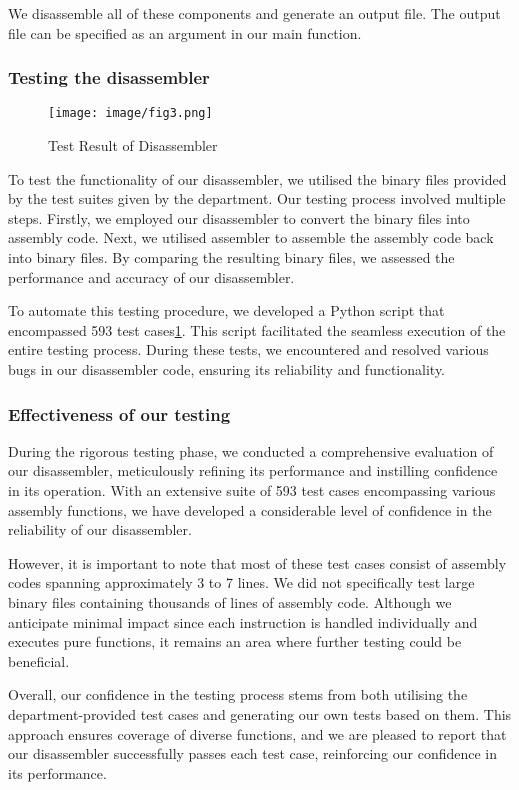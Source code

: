 \documentclass{article}
\begin{document}
\begin{adjustwidth}{2em}{0pt}
        
            We disassemble all of these components and generate an output file. The output file can be specified as an argument in our main function.
        
        \subsubsection{Testing the disassembler}
        
            \begin{figure}[h]
            \centering
            \texttt{[image: image/fig3.png]} 
            \caption{Test Result of Disassembler}
            \label{fig:test}
            \end{figure}
        
            To test the functionality of our disassembler, we utilised the binary files provided by the test suites given by the department. Our testing process involved multiple steps. Firstly, we employed our disassembler to convert the binary files into assembly code. Next, we utilised assembler to assemble the assembly code back into binary files. By comparing the resulting binary files, we assessed the performance and accuracy of our disassembler.
        
            To automate this testing procedure, we developed a Python script that encompassed 593 test cases\ref{fig:test}. This script facilitated the seamless execution of the entire testing process. During these tests, we encountered and resolved various bugs in our disassembler code, ensuring its reliability and functionality.
    
     
        \subsubsection{Effectiveness of our testing}
            During the rigorous testing phase, we conducted a comprehensive evaluation of our disassembler, meticulously refining its performance and instilling confidence in its operation. With an extensive suite of 593 test cases encompassing various assembly functions, we have developed a considerable level of confidence in the reliability of our disassembler.
            
            However, it is important to note that most of these test cases consist of assembly codes spanning approximately 3 to 7 lines. We did not specifically test large binary files containing thousands of lines of assembly code. Although we anticipate minimal impact since each instruction is handled individually and executes pure functions, it remains an area where further testing could be beneficial.
            
            Overall, our confidence in the testing process stems from both utilising the department-provided test cases and generating our own tests based on them. This approach ensures coverage of diverse functions, and we are pleased to report that our disassembler successfully passes each test case, reinforcing our confidence in its performance.

        \end{adjustwidth}
    
\end{document}

